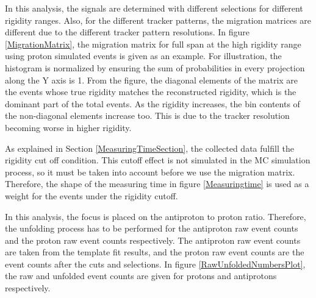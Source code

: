 In this analysis, the signals are determined with different selections for different rigidity ranges. Also, for the different tracker patterns, the migration matrices are different due to the different tracker pattern resolutions. In figure \ref{MigrationMatrix}, the migration matrix for full span at the high rigidity range using proton simulated events is given as an example. For illustration, the histogram is normalized by ensuring the sum of probabilities in every projection along the Y axis is 1. From the figure, the diagonal elements of the matrix are the events whose true rigidity matches the reconstructed rigidity, which is the dominant part of the total events. As the rigidity increases, the bin contents of the non-diagonal elements increase too. This is due to the tracker resolution becoming worse in higher rigidity.   \par

As explained in Section \ref{MeasuringTimeSection}, the collected data fulfill the rigidity cut off condition. This cutoff effect is not simulated in the MC simulation process, so it must be taken into account before we use the migration matrix. Therefore, the shape of the measuring time in figure \ref{Measuringtime} is used as a weight for the events under the rigidity cutoff.  \par



In this analysis, the focus is placed on the antiproton to proton ratio. Therefore, the unfolding process has to be performed for the antiproton raw event counts and the proton raw event counts respectively. The antiproton raw event counts are taken from the template fit results, and the proton raw event counts are the event counts after the cuts and selections. In figure \ref{RawUnfoldedNumbersPlot}, the raw and unfolded event counts are given for protons and antiprotons respectively.

